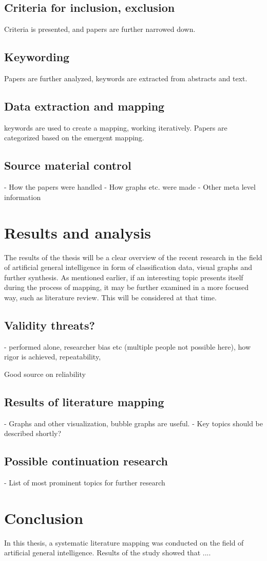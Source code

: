 \documentclass[utf8,english]{gradu3}
\begin{document}
\section{Criteria for inclusion, exclusion}
Criteria is presented, and papers are further narrowed down.

\section{Keywording}
Papers are further analyzed, keywords are extracted from abstracts and text. 

\section{Data extraction and mapping}
keywords are used to create a mapping, working iteratively. Papers are
categorized based on the emergent mapping.

\section{Source material control}
- How the papers were handled
- How graphs etc. were made
- Other meta level information

\chapter{Results and analysis}
The results of the thesis will be a clear overview of the recent research in the
field of artificial general intelligence in form of classification data, visual
graphs and further synthesis. As mentioned earlier, if an interesting topic
presents itself during the process of mapping, it may be further examined in a
more focused way, such as literature review. This will be considered at that
time.

\section{Validity threats?}

- performed alone, researcher bias etc (multiple people not possible here),
how rigor is achieved, repeatability, 

Good source on reliability \cite{wohlin2013}

\section{Results of literature mapping}
- Graphs and other visualization, bubble graphs are useful.
- Key topics should be described shortly?

\section{Possible continuation research}

- List of most prominent topics for further research

\chapter{Conclusion}
In this thesis, a systematic literature mapping was conducted on the field of
artificial general intelligence. Results of the study showed that .... 

\printbibliography
\end{document}
